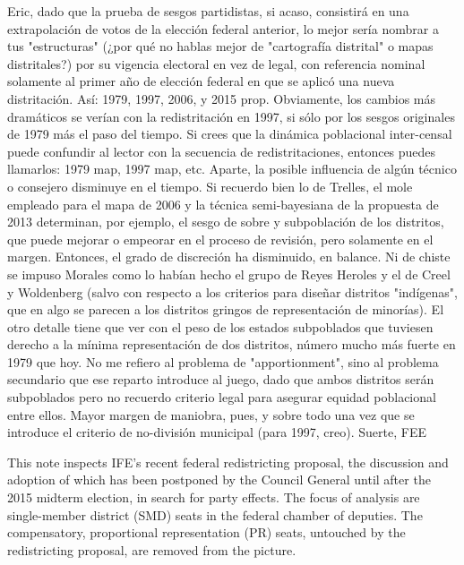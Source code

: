 \documentclass[letter,12pt]{article}
\begin{document}
Eric, dado que la prueba de sesgos partidistas, si acaso, consistirá en una extrapolación de votos de la elección federal anterior, lo mejor sería nombrar a tus "estructuras" (¿por qué no hablas mejor de "cartografía distrital" o mapas distritales?) por su vigencia electoral en vez de legal, con referencia nominal solamente al primer año de elección federal en que se aplicó una nueva distritación.  Así:  1979, 1997, 2006, y 2015 prop.  Obviamente, los cambios más dramáticos se verían con la redistritación en 1997, si sólo por los sesgos originales de 1979 más el paso del tiempo.  Si crees que la dinámica poblacional inter-censal puede confundir al lector con la secuencia de redistritaciones, entonces puedes llamarlos:  1979 map, 1997 map, etc.  Aparte, la posible influencia de algún técnico o consejero disminuye en el tiempo.  Si recuerdo bien lo de Trelles, el mole empleado para el mapa de 2006 y la técnica semi-bayesiana de la propuesta de 2013  determinan, por ejemplo, el sesgo de sobre y subpoblación de los distritos, que puede mejorar o empeorar en el proceso de revisión, pero solamente en el margen.  Entonces, el grado de discreción ha disminuido, en balance.  Ni de chiste se impuso Morales como lo habían hecho el grupo de Reyes Heroles y el de Creel y Woldenberg (salvo con respecto a los criterios para diseñar distritos "indígenas", que en algo se parecen a los distritos gringos de representación de minorías).  El otro detalle tiene que ver con el peso de los estados subpoblados que tuviesen derecho a la mínima representación de dos distritos, número mucho más fuerte en 1979 que hoy.  No me refiero al problema de "apportionment", sino al problema secundario que ese reparto introduce al juego, dado que ambos distritos serán subpoblados pero no recuerdo criterio legal para asegurar equidad poblacional entre ellos.  Mayor margen de maniobra, pues, y sobre todo una vez que se introduce el criterio de no-división municipal (para 1997, creo).  Suerte, FEE


\noindent This note inspects IFE's recent federal redistricting proposal, the discussion and adoption of which has been postponed by the Council General until after the 2015 midterm election, in search for party effects. The focus of analysis are single-member district (SMD) seats in the federal chamber of deputies. The compensatory, proportional representation (PR) seats, untouched by the redistricting proposal, are removed from the picture. 
\end{document}
